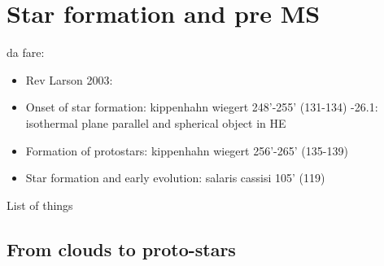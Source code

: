 \section{Star formation and pre MS}

\begin{wordonframe}{da fare: }
\begin{itemize}
    \item Rev Larson 2003:
    \item Onset of star formation: kippenhahn wiegert 248'-255' (131-134) -26.1: isothermal plane parallel and spherical object in HE
    \item Formation of protostars: kippenhahn wiegert 256'-265' (135-139)
    \item Star formation and early evolution: salaris cassisi 105' (119)
\end{itemize}
\end{wordonframe}


\begin{frame}[allowframebreaks]{List of things}
\listoftodos
\end{frame}

\subsection{From clouds to proto-stars}


